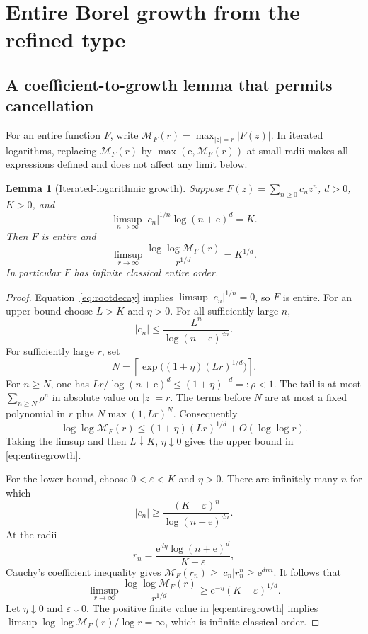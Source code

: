 \documentclass[11pt,a4paper]{article}
\numberwithin{equation}{section}
\newtheorem{lemma}[theorem]{Lemma}
\theoremstyle{definition}
\theoremstyle{remark}
\newcommand{\ee}{\mathrm e}
\begin{document}
\section{Entire Borel growth from the refined type}
\label{sec:growth}

\subsection{A coefficient-to-growth lemma that permits cancellation}

For an entire function $F$, write
$\mathcal M_F(r)=\max_{|z|=r}|F(z)|$.
In iterated logarithms, replacing $\mathcal M_F(r)$ by
$\max(\ee,\mathcal M_F(r))$ at small radii makes all expressions
defined and does not affect any limit below.

\begin{lemma}[Iterated-logarithmic growth]
\label{lem:entiregrowth}
Suppose $F(z)=\sum_{n\ge0}c_nz^n$, $d>0$, $K>0$, and
\begin{equation}
 \limsup_{n\to\infty}|c_n|^{1/n}\log(n+\ee)^d=K.
 \label{eq:rootdecay}
\end{equation}
Then $F$ is entire and
\begin{equation}
 \limsup_{r\to\infty}
 \frac{\log\log\mathcal M_F(r)}{r^{1/d}}=K^{1/d}.
 \label{eq:entiregrowth}
\end{equation}
In particular $F$ has infinite classical entire order.
\end{lemma}
\begin{proof}
Equation~\eqref{eq:rootdecay} implies $\limsup|c_n|^{1/n}=0$,
so $F$ is entire. For an upper bound choose $L>K$ and $\eta>0$.
For all sufficiently large $n$,
\[
 |c_n|\le\frac{L^n}{\log(n+\ee)^{dn}}.
\]
For sufficiently large $r$, set
\[
 N=\left\lceil\exp\bigl((1+\eta)(Lr)^{1/d}\bigr)\right\rceil.
\]
For $n\ge N$, one has
$Lr/\log(n+\ee)^d\le(1+\eta)^{-d}=:\rho<1$.
The tail is at most $\sum_{n\ge N}\rho^n$ in absolute value on
$|z|=r$. The terms before $N$ are at most a fixed polynomial in $r$
plus $N\max(1,Lr)^N$. Consequently
\[
 \log\log\mathcal M_F(r)
 \le (1+\eta)(Lr)^{1/d}+O(\log\log r).
\]
Taking the limsup and then $L\downarrow K$, $\eta\downarrow0$
gives the upper bound in \eqref{eq:entiregrowth}.

For the lower bound, choose $0<\varepsilon<K$ and $\eta>0$.
There are infinitely many $n$ for which
\[
 |c_n|\ge\frac{(K-\varepsilon)^n}{\log(n+\ee)^{dn}}.
\]
At the radii
\[
 r_n=\frac{\ee^{d\eta}\log(n+\ee)^d}{K-\varepsilon},
\]
Cauchy's coefficient inequality gives
$\mathcal M_F(r_n)\ge|c_n|r_n^n\ge\ee^{d\eta n}$.
It follows that
\[
 \limsup_{r\to\infty}
 \frac{\log\log\mathcal M_F(r)}{r^{1/d}}
 \ge \ee^{-\eta}(K-\varepsilon)^{1/d}.
\]
Let $\eta\downarrow0$ and $\varepsilon\downarrow0$.
The positive finite value in \eqref{eq:entiregrowth} implies
$\limsup\log\log\mathcal M_F(r)/\log r=\infty$, which is infinite
classical order.
\end{proof}
\end{document}
